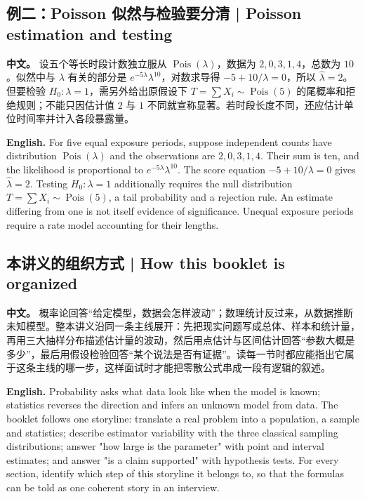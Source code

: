 \documentclass[UTF8,11pt,a4paper]{ctexart}
\newcommand{\APS}[2]{\par\noindent\textbf{中文。} #1\par\noindent\textbf{English.} #2\par\smallskip}
\begin{document}
\subsection*{例二：Poisson 似然与检验要分清 | Poisson estimation and testing}
\APS{设五个等长时段计数独立服从 $\operatorname{Pois}(\lambda)$，数据为 $2,0,3,1,4$，总数为 $10$。似然中与 $\lambda$ 有关的部分是 $e^{-5\lambda}\lambda^{10}$，对数求导得 $-5+10/\lambda=0$，所以 $\widehat\lambda=2$。但要检验 $H_0:\lambda=1$，需另外给出原假设下 $T=\sum X_i\sim\operatorname{Pois}(5)$ 的尾概率和拒绝规则；不能只因估计值 $2$ 与 $1$ 不同就宣称显著。若时段长度不同，还应估计单位时间率并计入各段暴露量。}{For five equal exposure periods, suppose independent counts have distribution $\operatorname{Pois}(\lambda)$ and the observations are $2,0,3,1,4$. Their sum is ten, and the likelihood is proportional to $e^{-5\lambda}\lambda^{10}$. The score equation $-5+10/\lambda=0$ gives $\widehat\lambda=2$. Testing $H_0:\lambda=1$ additionally requires the null distribution $T=\sum X_i\sim\operatorname{Pois}(5)$, a tail probability and a rejection rule. An estimate differing from one is not itself evidence of significance. Unequal exposure periods require a rate model accounting for their lengths.}

\subsection*{本讲义的组织方式 | How this booklet is organized}
\APS{概率论回答“给定模型，数据会怎样波动”；数理统计反过来，从数据推断未知模型。整本讲义沿同一条主线展开：先把现实问题写成总体、样本和统计量，再用三大抽样分布描述估计量的波动，然后用点估计与区间估计回答“参数大概是多少”，最后用假设检验回答“某个说法是否有证据”。读每一节时都应能指出它属于这条主线的哪一步，这样面试时才能把零散公式串成一段有逻辑的叙述。}{Probability asks what data look like when the model is known; statistics reverses the direction and infers an unknown model from data. The booklet follows one storyline: translate a real problem into a population, a sample and statistics; describe estimator variability with the three classical sampling distributions; answer "how large is the parameter" with point and interval estimates; and answer "is a claim supported" with hypothesis tests. For every section, identify which step of this storyline it belongs to, so that the formulas can be told as one coherent story in an interview.}
\end{document}
